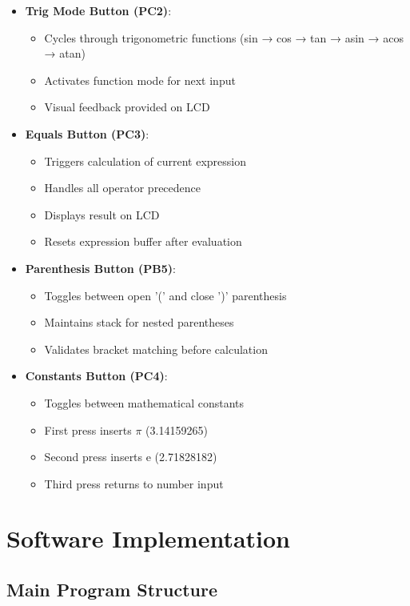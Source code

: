 \documentclass{article}
\begin{document}
\begin{itemize}
\item \textbf{Trig Mode Button (PC2)}:
\begin{itemize}
\item Cycles through trigonometric functions (sin → cos → tan → asin → acos → atan)
\item Activates function mode for next input
\item Visual feedback provided on LCD
\end{itemize}

\item \textbf{Equals Button (PC3)}:
\begin{itemize}
\item Triggers calculation of current expression
\item Handles all operator precedence
\item Displays result on LCD
\item Resets expression buffer after evaluation
\end{itemize}

\item \textbf{Parenthesis Button (PB5)}:
\begin{itemize}
\item Toggles between open '(' and close ')' parenthesis
\item Maintains stack for nested parentheses
\item Validates bracket matching before calculation
\end{itemize}

\item \textbf{Constants Button (PC4)}:
\begin{itemize}
\item Toggles between mathematical constants
\item First press inserts $\pi$ (3.14159265)
\item Second press inserts e (2.71828182)
\item Third press returns to number input
\end{itemize}
\end{itemize}

\section{Software Implementation}

\subsection{Main Program Structure}
\end{document}
